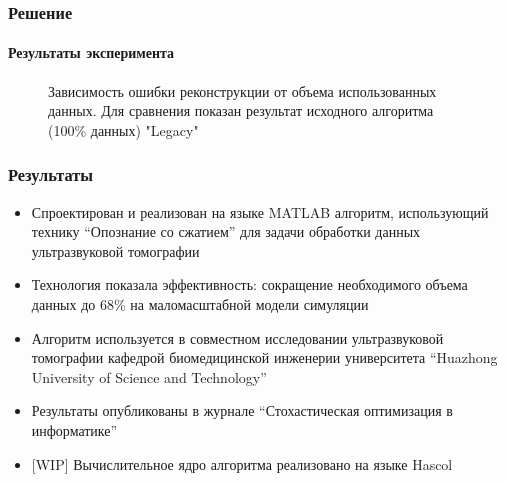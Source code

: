 \documentclass{beamer}
\begin{document}
\begin{frame}
\frametitle{Решение}
\framesubtitle{Результаты эксперимента}
\begin{figure}[h]
\centering
    \caption{\small Зависимость ошибки реконструкции от объема использованных данных. Для сравнения показан результат исходного алгоритма (100\% данных) "Legacy"}
\end{figure}

\end{frame}



\begin{frame}
\frametitle{Результаты}
\begin{itemize}\small
\item Спроектирован и реализован на языке MATLAB алгоритм, использующий технику ``Опознание со сжатием'' для задачи обработки данных ультразвуковой томографии
\item Технология показала эффективность: сокращение необходимого объема данных до 68\% на маломасштабной модели симуляции
\item Алгоритм используется в совместном исследовании ультразвуковой томографии кафедрой биомедицинской инженерии университета ``Huazhong University of Science and Technology''
\item Результаты опубликованы в журнале ``Стохастическая оптимизация в информатике''
\item{[WIP]} Вычислительное ядро алгоритма реализовано на языке Hascol
\end{itemize}


\end{frame}
\end{document}
